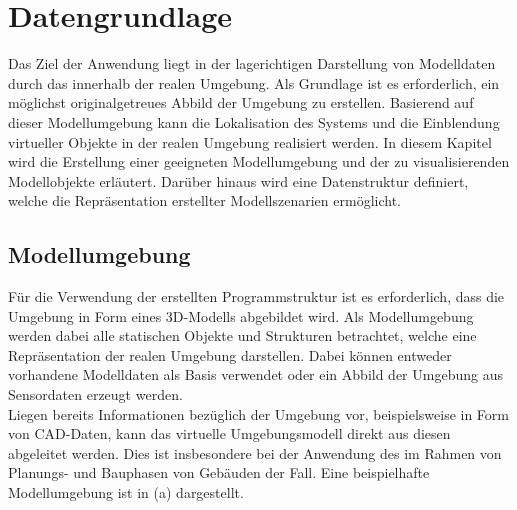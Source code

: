 \chapter{Datengrundlage}
\label{chap.modeldata}
\prever{
}

Das Ziel der Anwendung liegt in der lagerichtigen Darstellung von Modelldaten durch das \kps{} innerhalb der realen Umgebung. Als Grundlage ist es erforderlich, ein möglichst originalgetreues Abbild der Umgebung zu erstellen. Basierend auf dieser Modellumgebung kann die Lokalisation des Systems und die Einblendung virtueller Objekte in der realen Umgebung realisiert werden. In diesem Kapitel wird die Erstellung einer geeigneten Modellumgebung und der zu visualisierenden Modellobjekte erläutert. Darüber hinaus wird eine Datenstruktur definiert, welche die Repräsentation erstellter Modellszenarien ermöglicht.


\section{Modellumgebung}
\label{chap.slam}
Für die Verwendung der erstellten Programmstruktur ist es erforderlich, dass die Umgebung in Form eines 3D-Modells abgebildet wird. Als Modellumgebung werden dabei alle statischen Objekte und Strukturen betrachtet, welche eine Repräsentation der realen Umgebung darstellen. Dabei können entweder vorhandene Modelldaten als Basis verwendet oder ein Abbild der Umgebung aus Sensordaten erzeugt werden.\\

Liegen bereits Informationen bezüglich der Umgebung vor, beispielsweise in Form von CAD-Daten, kann das virtuelle Umgebungsmodell direkt aus diesen abgeleitet werden. Dies ist insbesondere bei der Anwendung des  im Rahmen von Planungs- und Bauphasen von Gebäuden der Fall. Eine beispielhafte Modellumgebung ist in  (a) dargestellt.\\

